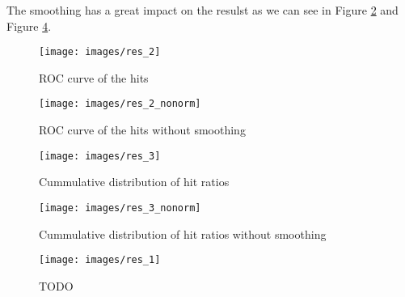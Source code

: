 The smoothing has a great impact on the resulst as we can see in Figure \ref{obr:res_2_nonorm}
and Figure \ref{obr:res_3_nonorm}.

\begin{figure}
\centerline{\texttt{[image: images/res\_2]}}
\caption[TODO]{ROC curve of the hits}
\label{obr:res_2}
\end{figure}

\begin{figure}
\centerline{\texttt{[image: images/res\_2\_nonorm]}}
\caption[TODO]{ROC curve of the hits without smoothing}
\label{obr:res_2_nonorm}
\end{figure}

\begin{figure}
\centerline{\texttt{[image: images/res\_3]}}
\caption[TODO]{Cummulative distribution of hit ratios}
\label{obr:res_3}
\end{figure}

\begin{figure}
\centerline{\texttt{[image: images/res\_3\_nonorm]}}
\caption[TODO]{Cummulative distribution of hit ratios without smoothing}
\label{obr:res_3_nonorm}
\end{figure}

\begin{figure}
\centerline{\texttt{[image: images/res\_1]}}
\caption[TODO]{TODO}
\label{obr:res_1}
\end{figure}
